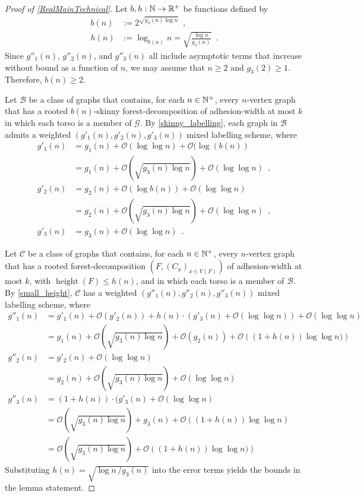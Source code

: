 \documentclass{patmorin}
\renewcommand{\ge}{\geqslant}
\renewcommand{\leq}{\leqslant}
\DeclareMathOperator{\height}{height}
\newcommand{\Oh}{\calO}
\newcommand{\calB}{\mathcal{B}}
\newcommand{\calC}{\mathcal{C}}
\newcommand{\calG}{\mathcal{G}}
\newcommand{\calO}{\mathcal{O}}
\begin{document}
  \begin{proof}[Proof of \cref{RealMainTechnical}]
    Let $b,h:\mathbb{N}\to\mathbb{R}^+$ be functions defined by
    \begin{align*}
      b(n) &:=2^{\sqrt{g_3(n)\log n}}\enspace,\\
      h(n) &:= \log_{b(n)}n = \sqrt{\frac{\log n}{g_3(n)}} \enspace .
    \end{align*}
    Since $g''_1(n)$, $g''_2(n)$, and $g''_3(n)$ all include asymptotic terms that increase without bound as a function of $n$, we may assume that $n\ge 2$ and $g_3(2)\ge 1$.  Therefore, $b(n)\ge 2$.


    Let $\calB$ be a class of graphs that contains, for each $n\in\mathbb{N}^+$, every $n$-vertex graph that has a rooted $b(n)$-skinny forest-decomposition of adhesion-width at most $k$ in which each torso is a member of $\calG$.
    By \cref{skinny_labelling}, each graph in $\calB$ admits a
    weighted $(g'_1(n),g'_2(n),g'_3(n))$ mixed labelling scheme, where
    \begin{align*}
     g'_1(n) & = g_1(n) + \Oh(\log\log n) + \Oh(\log(b(n))\\
     & = g_1(n) + \Oh\left(\sqrt{g_3(n) \log n}\right) + \Oh(\log\log n)\enspace, \\
     g'_2(n) & = g_2(n)+ \Oh(\log b(n))+\Oh(\log\log n)\\
          & = g_2(n) + \Oh\left(\sqrt{g_3(n) \log n}\right) + \Oh(\log\log n)\enspace, \\
     g'_3(n) & = g_3(n) + \Oh(\log\log n)\enspace.
    \end{align*}

    Let $\calC$ be a class of graphs that contains, for each $n\in\mathbb{N}^+$,
    every $n$-vertex graph that has a rooted forest-decomposition $(F,(C_x)_{x\in V(F)})$
    of adhesion-width at most $k$, with $\height(F)\leq h(n)$, and
    in which each torso is a member of $\calB$.
    By \cref{small_height}, $\calC$ has a weighted $(g''_1(n),g''_2(n),g''_3(n))$ mixed labelling scheme, where
    \begin{align*}
     g''_1(n) & = g'_1(n) + \Oh(g'_2(n)) + h(n)\cdot (g'_3(n)+\Oh(\log\log n)) + \Oh(\log\log n) \\
       & = g_1(n) +  \Oh\left(\sqrt{g_3(n) \log n}\right) + \Oh(g_2(n)) + \Oh\left((1+h(n))\log\log n)\right) \\
     g''_2(n) & = g'_2(n) + \Oh(\log\log n) \\
       & = g_2(n) + \Oh\left(\sqrt{{g_3(n)\log n}}\right) + \Oh(\log\log n) \\
     g''_3(n) & = (1+h(n))\cdot (g'_3(n)+\Oh(\log\log n)\\%
       & = \Oh\left(\sqrt{g_3(n)\log n}\right) + g_3(n) + \Oh\left((1+h(n))\log\log n\right) \\
       & = \Oh\left(\sqrt{g_3(n) \log n}\right) + \Oh\left((1+h(n))\log\log n)\right)
   \end{align*}
   Substituting $h(n) = \sqrt{\log n\, / g_3(n)}$ into the error terms yields the bounds in the lemma statement.


\end{proof}
\end{document}
